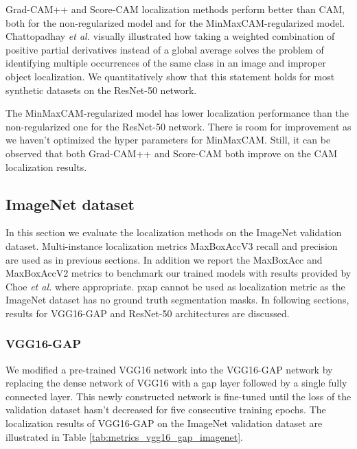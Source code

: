 Grad-CAM++ and Score-CAM localization methods perform better than CAM, both for the non-regularized model and for the MinMaxCAM-regularized model. Chattopadhay \textit{et al.} \cite{chattopadhyay2017grad} visually illustrated how taking a weighted combination of positive partial derivatives instead of a global average solves the problem of identifying multiple occurrences of the same class in an image and improper object localization. We quantitatively show that this statement holds for most synthetic datasets on the ResNet-50 network.

The MinMaxCAM-regularized model has lower localization performance than the non-regularized one for the ResNet-50 network. There is room for improvement as we haven't optimized the hyper parameters for MinMaxCAM. Still, it can be observed that both Grad-CAM++ and Score-CAM both improve on the CAM localization results.

\subsection{ImageNet dataset}
In this section we evaluate the localization methods on the ImageNet validation dataset. Multi-instance localization metrics MaxBoxAccV3 recall and precision are used as in previous sections. In addition we report the MaxBoxAcc and MaxBoxAccV2 metrics to benchmark our trained models with results provided by Choe \textit{et al.} \cite{choe2020evaluating} where appropriate. \acrfull{pxap} cannot be used as localization metric as the ImageNet dataset has no ground truth segmentation masks. In following sections, results for VGG16-GAP and ResNet-50 architectures are discussed.

\subsubsection{VGG16-GAP}
We modified a pre-trained VGG16 network into the VGG16-GAP network by replacing the dense network of VGG16 with a \acrshort{gap} layer followed by a single fully connected layer. This newly constructed network is fine-tuned until the loss of the validation dataset hasn't decreased for five consecutive training epochs. The localization results of VGG16-GAP on the ImageNet validation dataset are illustrated in Table \ref{tab:metrics_vgg16_gap_imagenet}.

